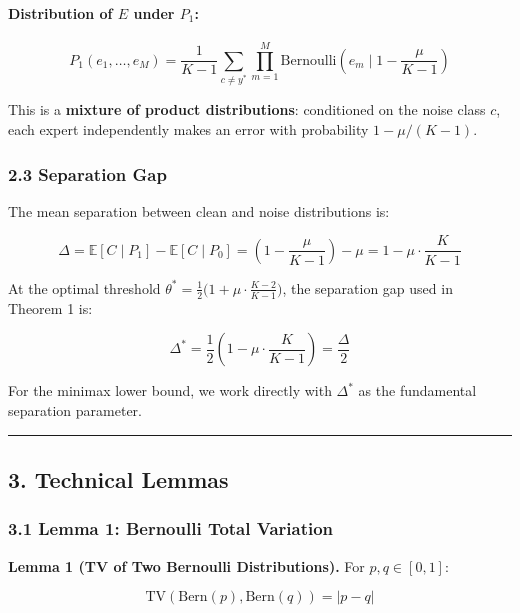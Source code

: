\documentclass[
  12pt,
]{article}
\begin{document}
\paragraph{\texorpdfstring{Distribution of \(E\) under
\(P_1\):}{Distribution of E under P\_1:}}\label{distribution-of-e-under-p_1}

\[P_1(e_1, \dots, e_M) = \frac{1}{K-1} \sum_{c \neq y^*} \prod_{m=1}^M \text{Bernoulli}\!\left(e_m \;\Big|\; 1 - \frac{\mu}{K-1}\right)\]

This is a \textbf{mixture of product distributions}: conditioned on the
noise class \(c\), each expert independently makes an error with
probability \(1 - \mu/(K-1)\).

\subsubsection{2.3 Separation Gap}\label{separation-gap}

The mean separation between clean and noise distributions is:

\[\Delta = \mathbb{E}[C \mid P_1] - \mathbb{E}[C \mid P_0]
      = \left(1 - \frac{\mu}{K-1}\right) - \mu
      = 1 - \mu \cdot \frac{K}{K-1}\]

At the optimal threshold
\(\theta^* = \frac{1}{2}\bigl(1 + \mu\cdot\frac{K-2}{K-1}\bigr)\), the
separation gap used in Theorem 1 is:

\[\Delta^* = \frac{1}{2}\left(1 - \mu \cdot \frac{K}{K-1}\right) = \frac{\Delta}{2}\]

For the minimax lower bound, we work directly with \(\Delta^*\) as the
fundamental separation parameter.

\begin{center}\rule{0.5\linewidth}{0.5pt}\end{center}

\subsection{3. Technical Lemmas}\label{technical-lemmas}

\subsubsection{3.1 Lemma 1: Bernoulli Total
Variation}\label{lemma-1-bernoulli-total-variation}

\textbf{Lemma 1 (TV of Two Bernoulli Distributions).} For
\(p, q \in [0,1]\):

\[\text{TV}(\text{Bern}(p), \text{Bern}(q)) = |p - q|\]
\end{document}
